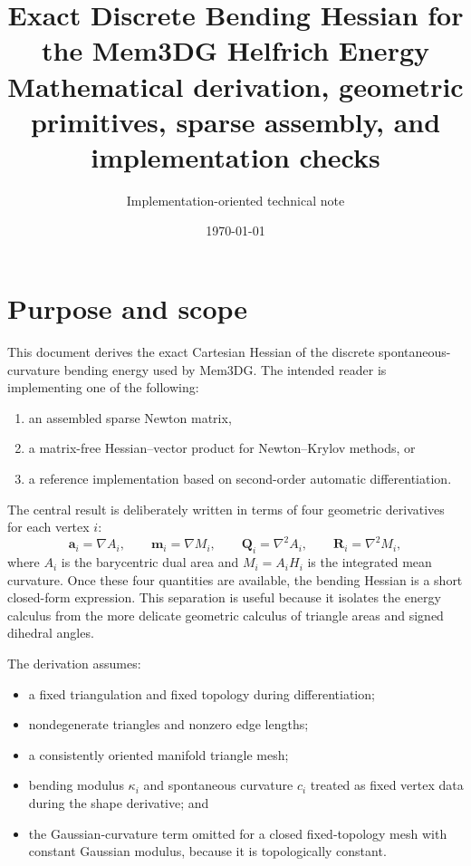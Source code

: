 \documentclass[11pt]{article}
\title{Exact Discrete Bending Hessian for the Mem3DG Helfrich Energy\\
\large Mathematical derivation, geometric primitives, sparse assembly, and implementation checks}
\author{Implementation-oriented technical note}
\date{\today}
\newcommand{\grad}{\nabla}
\newcommand{\Hess}{\nabla^2}
\newcommand{\aV}{\mathbf{a}}
\newcommand{\mV}{\mathbf{m}}
\newcommand{\Q}{\mathbf{Q}}
\newcommand{\Mmat}{\mathbf{R}}
\begin{document}
\maketitle
\tableofcontents
\newpage

\section{Purpose and scope}

This document derives the exact Cartesian Hessian of the discrete spontaneous-curvature bending energy used by Mem3DG.  The intended reader is implementing one of the following:
\begin{enumerate}[label=(\alph*)]
  \item an assembled sparse Newton matrix,
  \item a matrix-free Hessian--vector product for Newton--Krylov methods, or
  \item a reference implementation based on second-order automatic differentiation.
\end{enumerate}

The central result is deliberately written in terms of four geometric derivatives for each vertex $i$:
\begin{equation}
  \aV_i = \grad A_i,
  \qquad
  \mV_i = \grad M_i,
  \qquad
  \Q_i = \Hess A_i,
  \qquad
  \Mmat_i = \Hess M_i,
\end{equation}
where $A_i$ is the barycentric dual area and $M_i=A_iH_i$ is the integrated mean curvature.  Once these four quantities are available, the bending Hessian is a short closed-form expression.  This separation is useful because it isolates the energy calculus from the more delicate geometric calculus of triangle areas and signed dihedral angles.

The derivation assumes:
\begin{itemize}
  \item a fixed triangulation and fixed topology during differentiation;
  \item nondegenerate triangles and nonzero edge lengths;
  \item a consistently oriented manifold triangle mesh;
  \item bending modulus $\kappa_i$ and spontaneous curvature $c_i$ treated as fixed vertex data during the shape derivative; and
  \item the Gaussian-curvature term omitted for a closed fixed-topology mesh with constant Gaussian modulus, because it is topologically constant.
\end{itemize}
\end{document}
